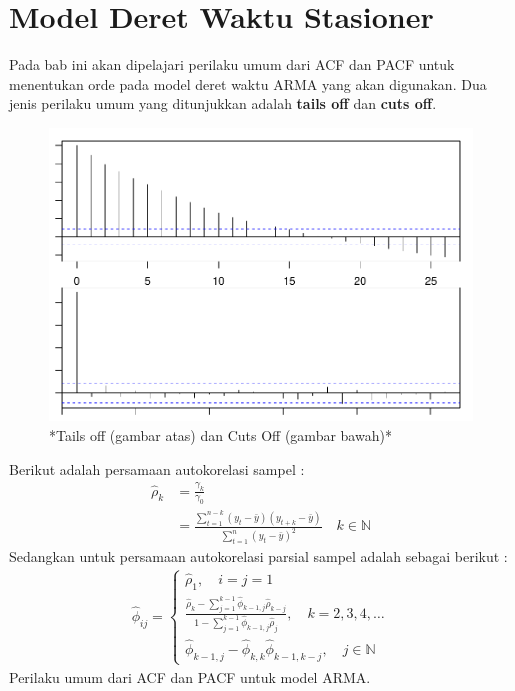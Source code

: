 \documentclass[
]{book}
\begin{document}
\hypertarget{model-deret-waktu-stasioner}{%
\chapter{Model Deret Waktu Stasioner}\label{model-deret-waktu-stasioner}}

Pada bab ini akan dipelajari perilaku umum dari ACF dan PACF untuk menentukan orde pada model deret waktu ARMA yang akan digunakan. Dua jenis perilaku umum yang ditunjukkan adalah \textbf{tails off} dan \textbf{cuts off}.\\

\begin{figure}

{\centering \includegraphics{_main_files/figure-latex/unnamed-chunk-1-1} 

}

\caption{*Tails off (gambar atas) dan Cuts Off (gambar bawah)*}\label{fig:unnamed-chunk-1}
\end{figure}

Berikut adalah persamaan autokorelasi sampel :
\begin{align*}
\hat{\rho}_k &= \frac{\gamma_k}{\gamma_0} \\
&= \frac{\sum_{t=1}^{n-k}(y_t - \bar{y})(y_{t+k} - \bar{y})}{\sum_{t=1}^n(y_t - \bar{y})^2} \quad k \in \mathbb{N}
\end{align*}
Sedangkan untuk persamaan autokorelasi parsial sampel adalah sebagai berikut :\\
\begin{align*}
\hat{\phi}_{ij} = \begin{cases}
\hat{\rho}_1, \quad i = j = 1 \\
\frac{\hat{\rho}_k - \sum_{j=1}^{k-1} \hat{\phi}_{k-1,j}\hat{\rho}_{k-j}}{1- \sum_{j=1}^{k-1} \hat{\phi}_{k-1,j}\hat{\rho}_{j}}, \quad k = 2,3,4,\dots \\
\hat{\phi}_{k-1,j} - \hat{\phi}_{k,k}\hat{\phi}_{k-1,k-j}, \quad j \in \mathbb{N}
\end{cases}
\end{align*}
Perilaku umum dari ACF dan PACF untuk model ARMA.
\end{document}
